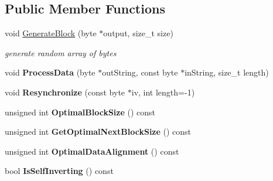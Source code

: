 \subsection*{Public Member Functions}
\begin{DoxyCompactItemize}
\item 
\hypertarget{class_additive_cipher_template_a3f473c11dcbad1364bc1886a43bf5e55}{
void \hyperlink{class_additive_cipher_template_a3f473c11dcbad1364bc1886a43bf5e55}{GenerateBlock} (byte $\ast$output, size\_\-t size)}
\label{class_additive_cipher_template_a3f473c11dcbad1364bc1886a43bf5e55}

\begin{DoxyCompactList}\small\item\em generate random array of bytes \item\end{DoxyCompactList}\item 
\hypertarget{class_additive_cipher_template_a134db9e708e4b52a8161a72adcfbe91c}{
void {\bfseries ProcessData} (byte $\ast$outString, const byte $\ast$inString, size\_\-t length)}
\label{class_additive_cipher_template_a134db9e708e4b52a8161a72adcfbe91c}

\item 
\hypertarget{class_additive_cipher_template_aa1d586475ed0e9fece85c1139522a994}{
void {\bfseries Resynchronize} (const byte $\ast$iv, int length=-\/1)}
\label{class_additive_cipher_template_aa1d586475ed0e9fece85c1139522a994}

\item 
\hypertarget{class_additive_cipher_template_a02181f39db019ca194822b8afcfaf559}{
unsigned int {\bfseries OptimalBlockSize} () const }
\label{class_additive_cipher_template_a02181f39db019ca194822b8afcfaf559}

\item 
\hypertarget{class_additive_cipher_template_a296c2eddb2ebdc88d2c52ea73a9fb8dd}{
unsigned int {\bfseries GetOptimalNextBlockSize} () const }
\label{class_additive_cipher_template_a296c2eddb2ebdc88d2c52ea73a9fb8dd}

\item 
\hypertarget{class_additive_cipher_template_a1c57acaee511a4fd54691ebf3392b422}{
unsigned int {\bfseries OptimalDataAlignment} () const }
\label{class_additive_cipher_template_a1c57acaee511a4fd54691ebf3392b422}

\item 
\hypertarget{class_additive_cipher_template_a04041a45748263f149a6eb76babc4a9b}{
bool {\bfseries IsSelfInverting} () const }
\label{class_additive_cipher_template_a04041a45748263f149a6eb76babc4a9b}


\end{DoxyCompactItemize}
